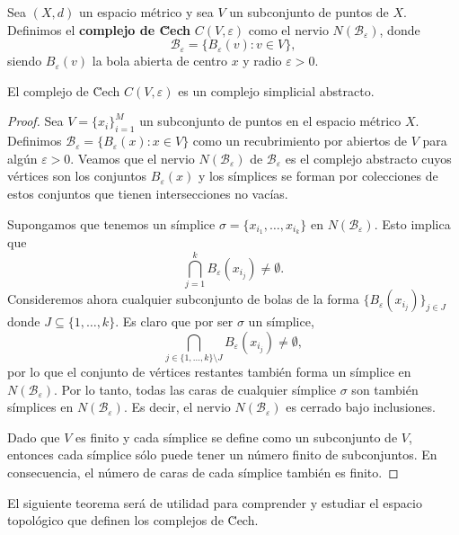 \begin{definicion}
	Sea \((X,d)\) un espacio métrico y sea \(V\) un subconjunto de puntos de \(X\). Definimos el \textbf{complejo de \u Cech} \(C(V, \varepsilon)\) como el nervio \(N(\mathcal{B}_\varepsilon)\), donde
	\[
		\mathcal{B}_\varepsilon = \{ B_{\varepsilon}(v) : v \in V \},
	\]
	siendo \(B_{\varepsilon}(v)\) la bola abierta de centro \(x\) y radio \(\varepsilon > 0\).
\end{definicion}

\begin{proposicion}
	El complejo de \u Cech \(C(V, \varepsilon)\) es un complejo simplicial abstracto.
\end{proposicion}
\begin{proof}
	Sea \( V = \{x_i\}_{i=1}^M \) un subconjunto de puntos en el espacio métrico \( X \). Definimos \( \mathcal{B}_\varepsilon = \{B_\varepsilon(x) : x \in V \} \) como un recubrimiento por abiertos de \( V \) para algún \(\varepsilon > 0\). Veamos que el nervio \( N(\mathcal{B}_\varepsilon) \) de \( \mathcal{B}_\varepsilon \) es el complejo abstracto cuyos vértices son los conjuntos \( B_\varepsilon(x) \) y los símplices se forman por colecciones de estos conjuntos que tienen intersecciones no vacías.
	
	Supongamos que tenemos un símplice \( \sigma = \{x_{i_1}, \ldots, x_{i_k}\} \) en \( N(\mathcal{B}_\varepsilon) \). Esto implica que
	\[
	\bigcap_{j=1}^k B_\varepsilon(x_{i_j}) \neq \emptyset.
	\]
	Consideremos ahora cualquier subconjunto de bolas de la forma  \(\{B_\varepsilon(x_{i_j})\}_{j \in J}\) donde \( J \subseteq \{1, \ldots, k\} \). Es claro que por ser $\sigma$ un símplice, 
	\[
	\bigcap_{j \in \{1, \ldots, k\} \setminus J} B_\varepsilon(x_{i_j}) \neq \emptyset,
	\]
	por lo que el conjunto de vértices restantes también forma un símplice en \( N(\mathcal{B}_\varepsilon) \). Por lo tanto, todas las caras de cualquier símplice \( \sigma \) son también símplices en \( N(\mathcal{B}_\varepsilon) \). Es decir, el nervio \( N(\mathcal{B}_\varepsilon) \) es cerrado bajo inclusiones.
	
	Dado que \( V \) es finito y cada símplice se define como un subconjunto de \( V \), entonces cada símplice sólo puede tener un número finito de subconjuntos. En consecuencia, el número de caras de cada símplice también es finito.
\end{proof}

El siguiente teorema será de utilidad para comprender y estudiar el espacio topológico que definen los complejos de \u Cech.

